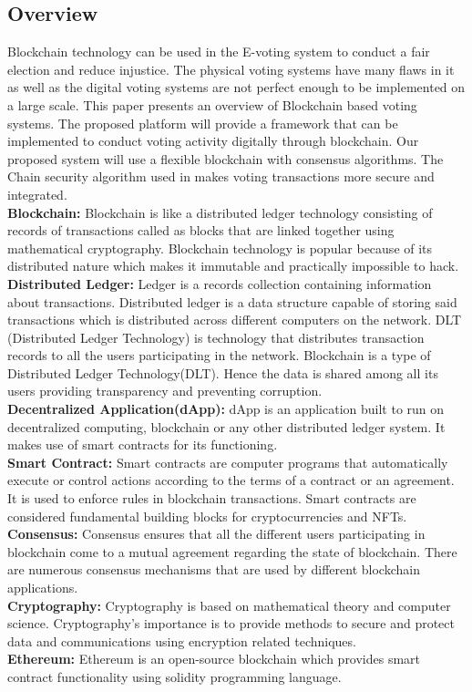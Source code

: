 \documentclass[oneside, 12pt]{book}
\begin{document}
		\subsection{Overview}
			Blockchain technology can be used in the E-voting system to conduct a fair election and reduce injustice. The physical voting systems have many flaws in it as well as the digital voting systems are not perfect enough to be implemented on a large scale. This paper presents an overview of Blockchain based voting systems. The proposed platform will provide a framework that can be implemented to conduct voting activity digitally through blockchain. Our proposed system will use a flexible blockchain with consensus algorithms. The Chain security algorithm used in makes voting transactions more secure and integrated.
			\\\textbf{Blockchain:} Blockchain is like a distributed ledger technology consisting of records of transactions called as blocks that are linked together using mathematical cryptography. Blockchain technology is popular because of its distributed nature which makes it immutable and practically impossible to hack.
			\\\textbf{Distributed Ledger:} Ledger is a records collection containing information about transactions. Distributed ledger is a data structure capable of storing said transactions which is distributed across different computers on the network. DLT (Distributed Ledger Technology) is technology that distributes transaction records to all the users participating in the network. Blockchain is a type of Distributed Ledger Technology(DLT). Hence the data is shared among all its users providing transparency and preventing corruption.
			\\\textbf{Decentralized Application(dApp):} dApp is an application built to run on decentralized computing, blockchain or any other distributed ledger system. It makes use of smart contracts for its functioning.
			\\\textbf{Smart Contract:} Smart contracts are computer programs that automatically execute or control actions according to the terms of a contract or an agreement. It is used to enforce rules in blockchain transactions. Smart contracts are considered fundamental building blocks for cryptocurrencies and NFTs.
			\\\textbf{Consensus:} Consensus ensures that all the different users participating in blockchain come to a mutual agreement regarding the state of blockchain. There are numerous consensus mechanisms that are used by different blockchain applications.
			\\\textbf{Cryptography:} Cryptography is based on mathematical theory and computer science. Cryptography’s importance is to provide methods to secure and protect data and communications using encryption related techniques.
			\\\textbf{Ethereum:} Ethereum is an open-source blockchain which provides smart contract functionality using solidity programming language.
\end{document}
